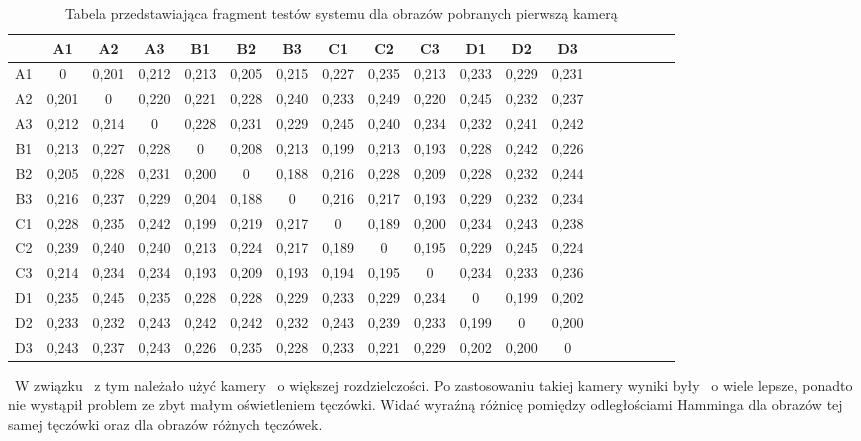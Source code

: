 \begin{table}
\begin{center}
\caption{Tabela przedstawiająca fragment testów systemu dla obrazów pobranych pierwszą kamerą}
\label{tab:pierwsza}
\begin{tabular}{|c|c|c|c|c|c|c|c|c|c|c|c|c|c|c|c|c|c|c|}
\hline
 & A1 & A2 & A3 & B1 & B2 & B3 & C1 & C2 & C3 & D1 & D2 & D3\\ \hline
A1 & 0&0,201&0,212&0,213&0,205&0,215&0,227&0,235&0,213&0,233&0,229&0,231 \\ \hline
A2 & 0,201&0&0,220&0,221&0,228&0,240&0,233&0,249&0,220&0,245&0,232&0,237 \\ \hline
A3 & 0,212&0,214&0&0,228&0,231&0,229&0,245&0,240&0,234&0,232&0,241&0,242\\ \hline
B1 & 0,213&0,227&0,228&0&0,208&0,213&0,199&0,213&0,193&0,228&0,242&0,226\\ \hline
B2 & 0,205&0,228&0,231&0,200&0&0,188&0,216&0,228&0,209&0,228&0,232&0,244\\ \hline
B3 & 0,216&0,237&0,229&0,204&0,188&0&0,216&0,217&0,193&0,229&0,232&0,234\\ \hline
C1 & 0,228&0,235&0,242&0,199&0,219&0,217&0&0,189&0,200&0,234&0,243&0,238\\ \hline
C2 & 0,239&0,240&0,240&0,213&0,224&0,217&0,189&0&0,195&0,229&0,245&0,224\\ \hline
C3 & 0,214&0,234&0,234&0,193&0,209&0,193&0,194&0,195&0&0,234&0,233&0,236\\ \hline
D1 & 0,235&0,245&0,235&0,228&0,228&0,229&0,233&0,229&0,234&0&0,199&0,202\\ \hline
D2 & 0,233&0,232&0,243&0,242&0,242&0,232&0,243&0,239&0,233&0,199&0&0,200\\ \hline
D3 & 0,243&0,237&0,243&0,226&0,235&0,228&0,233&0,221&0,229&0,202&0,200&0\\ \hline
\end{tabular}
\end{center}
\end{table}

~W związku ~z tym należało użyć kamery ~o większej rozdzielczości. Po zastosowaniu takiej kamery wyniki były ~o wiele lepsze, ponadto nie wystąpił problem ze zbyt małym oświetleniem tęczówki. Widać wyraźną różnicę pomiędzy odległościami Hamminga dla obrazów tej samej tęczówki oraz dla obrazów różnych tęczówek.

